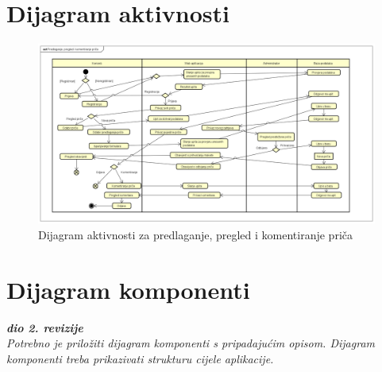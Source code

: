 			
			\eject 
		
		\section{Dijagram aktivnosti}
			
			\begin{figure}[H]
				\includegraphics[width=1\linewidth]{slike/Dijagram_aktivnosti_1.PNG} %
				\caption{Dijagram aktivnosti za predlaganje, pregled i komentiranje priča}
				\label{fig:diakt1} %
			\end{figure}
			
			\eject
		\section{Dijagram komponenti}
		
			\textbf{\textit{dio 2. revizije}}\\
		
			 \textit{Potrebno je priložiti dijagram komponenti s pripadajućim opisom. Dijagram komponenti treba prikazivati strukturu cijele aplikacije.}